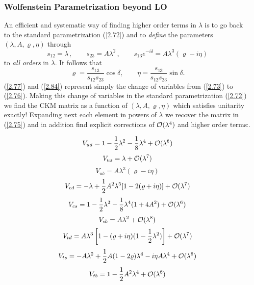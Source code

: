 \documentclass[12pt,rotate]{article}
\newcommand{\be}{\begin{equation}}
\newcommand{\ee}{\end{equation}}
\newcommand{\ord}{{\cal O}}
\begin{document}
\begin{itemize}
\subsubsection{Wolfenstein Parametrization beyond LO}
An efficient and systematic way of finding higher order terms in $\lambda$
is to go back to the standard parametrization (\ref{2.72}) and to
 {\it define} the parameters $(\lambda,A,\varrho,\eta)$ through 
\cite{BLO,schubert}
\begin{equation}\label{2.77} 
s_{12}=\lambda\,,
\qquad
s_{23}=A \lambda^2\,,
\qquad
s_{13} e^{-i\delta}=A \lambda^3 (\varrho-i \eta)
\end{equation}
to {\it  all orders} in $\lambda$. 
It follows  that
\begin{equation}\label{2.84} 
\varrho=\frac{s_{13}}{s_{12}s_{23}}\cos\delta,
\qquad
\eta=\frac{s_{13}}{s_{12}s_{23}}\sin\delta.
\end{equation}
(\ref{2.77}) and (\ref{2.84}) represent simply
the change of variables from (\ref{2.73}) to (\ref{2.76}).
Making this change of variables in the standard parametrization 
(\ref{2.72}) we find the CKM matrix as a function of 
$(\lambda,A,\varrho,\eta)$ which satisfies unitarity exactly!
Expanding next each element in powers of $\lambda$ we recover the
matrix in (\ref{2.75}) and in addition find explicit corrections of
$\ord(\lambda^4)$ and higher order terms:. 

\be
V_{ud}=1-\frac{1}{2}\lambda^2-\frac{1}{8}\lambda^4 +\ord(\lambda^6)
\ee
\be
V_{us}=\lambda+\ord(\lambda^7)
\ee
\be
V_{ub}=A \lambda^3 (\varrho-i \eta)
\ee
\be
V_{cd}=-\lambda+\frac{1}{2} A^2\lambda^5 [1-2 (\varrho+i \eta)]+
\ord(\lambda^7)
\ee
\be
V_{cs}= 1-\frac{1}{2}\lambda^2-\frac{1}{8}\lambda^4(1+4 A^2) +\ord(\lambda^6)
\ee
\be
V_{cb}=A\lambda^2+\ord(\lambda^8)
\ee
\be
V_{td}=A\lambda^3 \left[ 1-(\varrho+i \eta)(1-\frac{1}{2}\lambda^2)\right]
+\ord (\lambda^7)
\ee
\begin{equation}\label{2.83d}
 V_{ts}= -A\lambda^2+\frac{1}{2}A(1-2 \varrho)\lambda^4
-i\eta A \lambda^4 +\ord(\lambda^6)
\end{equation}
\be
V_{tb}=1-\frac{1}{2} A^2\lambda^4+\ord(\lambda^6)
\ee


\end{itemize}
\end{document}
